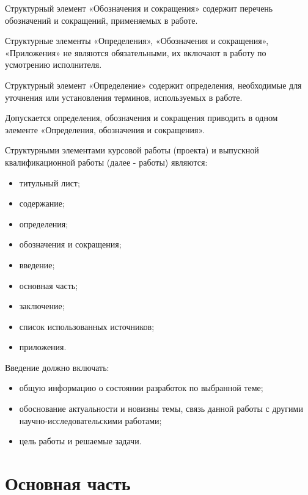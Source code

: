 \documentclass[14pt]{extreport}
\begin{document}
\pagestyle{empty} %


\pagestyle{plain} %
\tableofcontents

\abbreviations
Структурный элемент «Обозначения и сокращения» содержит перечень обозначений и сокращений, применяемых в работе. 

Структурные элементы «Определения», «Обозначения и сокращения», «Приложения»
не являются обязательными, их включают в работу по усмотрению исполнителя. 

Структурный элемент «Определение» содержит определения, необходимые для уточнения или установления терминов, используемых в работе.

\abbrevdef
Допускается определения, обозначения и сокращения приводить в одном элементе
«Определения, обозначения и сокращения».

\intro

Структурными элементами курсовой работы (проекта) и выпускной квалификационной работы (далее - работы) являются:
\begin{itemize}
\item титульный лист;
\item содержание;
\item определения;
\item обозначения и сокращения;
\item введение;
\item основная часть;
\item заключение;
\item список использованных источников;
\item приложения.
\end{itemize}

Введение должно включать:
\begin{itemize}
\item общую информацию о состоянии разработок по выбранной теме;  
\item обоснование актуальности и новизны темы, связь данной работы с другими научно-исследовательскими работами;
\item цель работы и решаемые задачи. 
\end{itemize}

\chapter{Основная часть\label{chapter2}}
\end{document}
